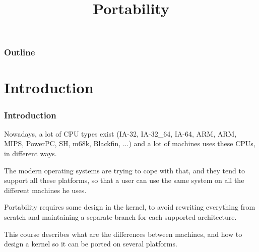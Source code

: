 %
%
%
%
%
%

%
%

%
%

\def\path{../../..}

%
%



%
%

\title{Portability}

%
%



%
%

\begin{frame}
  \titlepage
\end{frame}

%
%

\begin{frame}
  \frametitle{Outline}

  \tableofcontents
\end{frame}

%
%

%
%

\section{Introduction}

\begin{frame}
  \frametitle{Introduction}

  Nowadays, a lot of CPU types exist (IA-32, IA-32\_64, IA-64, ARM, ARM, MIPS, PowerPC, SH, m68k, Blackfin, ...) and a lot of machines uses these CPUs, in different ways.

  \-

  The modern operating systems are trying to cope with that, and they tend to support all these platforms, so that a user can use the same system on all the different machines he uses.

  \-

  Portability requires some design in the kernel, to avoid rewriting everything from scratch and maintaining a separate branch for each supported architecture.

  \-

  This course describes what are the differences between machines, and how to design a kernel so it can be ported on several platforms.

\end{frame}

